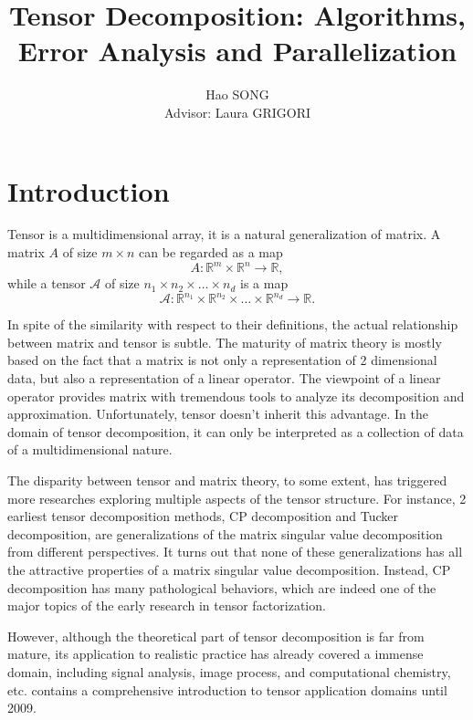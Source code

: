 \documentclass[12pt]{article}
\title{Tensor Decomposition: Algorithms, Error Analysis and Parallelization}
\author{Hao SONG\\{\small Advisor: Laura GRIGORI}}
\begin{document}
\maketitle
\tableofcontents
\newpage

\newtheorem{mydef}{Definition}
\newtheorem{myprop}{Proposition}
\newtheorem{mythm}{Theorem}
\newtheorem{mylem}{Lemma}
\newtheorem{mycor}{Corollary}
\newtheorem{mynot}{Notation}
\newtheorem{myrmk}{Remark}
\newtheorem{myalgo}{Algorithm}
\newtheorem{myprob}{Problem}

\section{Introduction}

Tensor is a multidimensional array, it is a natural generalization of matrix. A matrix $A$ of size $m \times n$ can be regarded as a map
$$ A : \mathbb{R}^m \times \mathbb{R}^n \rightarrow \mathbb{R},$$
while a tensor $\mathcal{A}$ of size $n_1 \times n_2 \times \dots \times n_d$ is a map
$$ \mathcal{A} : \mathbb{R}^{n_1} \times \mathbb{R}^{n_2} \times \dots \times \mathbb{R}^{n_d} \rightarrow \mathbb{R}. $$

In spite of the similarity with respect to their definitions, the actual relationship between matrix and tensor is subtle. The maturity of matrix theory is mostly based on the fact that a matrix is not only a representation of 2 dimensional data, but also a representation of a linear operator. The viewpoint of a linear operator provides matrix with tremendous tools to analyze its decomposition and approximation. Unfortunately, tensor doesn't inherit this advantage. In the domain of tensor decomposition, it can only be interpreted as a collection of data of a multidimensional nature.

The disparity between tensor and matrix theory, to some extent, has triggered more researches exploring multiple aspects of the tensor structure. For instance, 2 earliest tensor decomposition methods, CP decomposition and Tucker decomposition, are generalizations of the matrix singular value decomposition from different perspectives. It turns out that none of these generalizations has all the attractive properties of a matrix singular value decomposition. Instead, CP decomposition has many pathological behaviors, which are indeed one of the major topics of the early research in tensor factorization.

However, although the theoretical part of tensor decomposition is far from mature, its application to realistic practice has already covered a immense domain, including signal analysis, image process, and computational chemistry, etc. \cite{koldaapp} contains a comprehensive introduction to tensor application domains until 2009.
\end{document}
